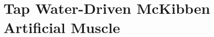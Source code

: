 
\chapter{Tap Water-Driven McKibben Artificial Muscle}
\label{ch:muscle}






























